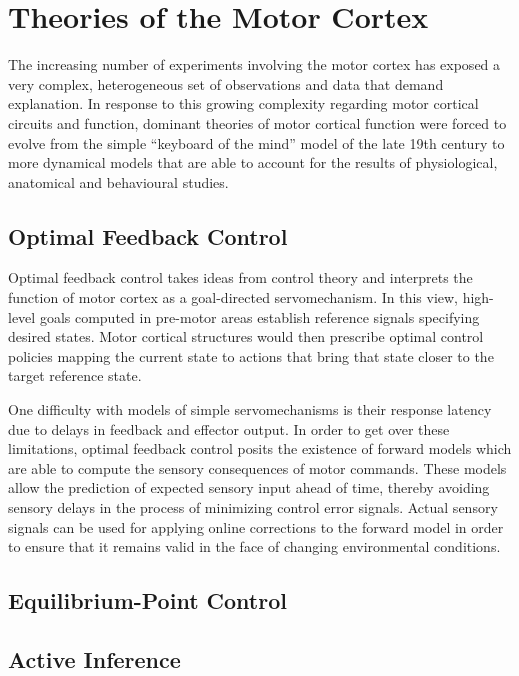 \section{Theories of the Motor Cortex}

The increasing number of experiments involving the motor cortex has exposed a very complex, heterogeneous set of observations and data that demand explanation. In response to this growing complexity regarding motor cortical circuits and function, dominant theories of motor cortical function were forced to evolve from the simple ``keyboard of the mind'' model of the late 19th century to more dynamical models that are able to account for the results of physiological, anatomical and behavioural studies.

\subsection{Optimal Feedback Control}

Optimal feedback control takes ideas from control theory and interprets the function of motor cortex as a goal-directed servomechanism. In this view, high-level goals computed in pre-motor areas establish reference signals specifying desired states. Motor cortical structures would then prescribe optimal control policies mapping the current state to actions that bring that state closer to the target reference state.

One difficulty with models of simple servomechanisms is their response latency due to delays in feedback and effector output. In order to get over these limitations, optimal feedback control posits the existence of forward models which are able to compute the sensory consequences of motor commands. These models allow the prediction of expected sensory input ahead of time, thereby avoiding sensory delays in the process of minimizing control error signals. Actual sensory signals can be used for applying online corrections to the forward model in order to ensure that it remains valid in the face of changing environmental conditions.

\subsection{Equilibrium-Point Control}



\subsection{Active Inference}

